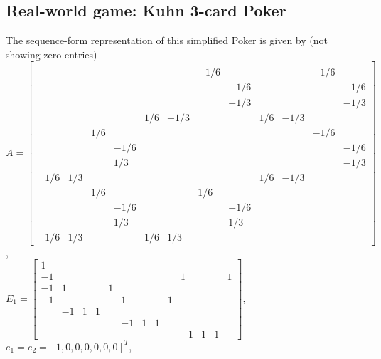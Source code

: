 \documentclass[12pt]{article}
\begin{document}
\subsection{Real-world game: Kuhn 3-card Poker}
The sequence-form representation of this simplified Poker is given by (not showing zero entries)\\
$A = \left[\begin{array}{ccccccccccccc}
  &   &   &   &   &   &   &   &   &   &   &   &  \\
  &   &   &   &   &   &   & -1 / 6 &   &   &   & -1 / 6 &  \\
  &   &   &   &   &   &   &   & -1 / 6 &   &   &   & -1 / 6\\
  &   &   &   &   &   &   &   & -1 / 3 &   &   &   & -1 / 3\\
  &   &   &   &   & 1 / 6 & -1 / 3 &   &   & 1 / 6 & -1 / 3 &   &  \\
  &   &   & 1 / 6 &   &   &   &   &   &   &   & -1 / 6 &  \\
  &   &   &   & -1 / 6 &   &   &   &   &   &   &   & -1 / 6\\
  &   &   &   & 1 / 3 &   &   &   &   &   &   &   & -1 / 3\\
  & 1 / 6 & 1 / 3 &   &   &   &   &   &   & 1 / 6 & -1 / 3 &   &  \\
  &   &   & 1 / 6 &   &   &   & 1 / 6 &   &   &   &   &  \\
  &   &   &   & -1 / 6 &   &   &   & -1 / 6 &   &   &   &  \\
  &   &   &   & 1 / 3 &   &   &   & 1 / 3 &   &   &   &  \\
  & 1 / 6 & 1 / 3 &   &   & 1 / 6 & 1 / 3 &   &   &   &   &   &  
\end{array}\right]$,\\
$E_1 = \left[\begin{array}{ccccccccccccc}
1 &   &   &   &   &   &   &   &   &   &   &   &  \\
-1 &   &   &   &   &   &   &   &   & 1 &   &   & 1\\
-1 & 1 &   &   & 1 &   &   &   &   &   &   &   &  \\
-1 &   &   &   &   & 1 &   &   & 1 &   &   &   &  \\
  & -1 & 1 & 1 &   &   &   &   &   &   &   &   &  \\
  &   &   &   &   & -1 & 1 & 1 &   &   &   &   &  \\
  &   &   &   &   &   &   &   &   & -1 & 1 & 1 &  
\end{array}\right]$, $e_1 = e_2 = [1, 0, 0, 0, 0, 0, 0]^T$,\\
\end{document}
